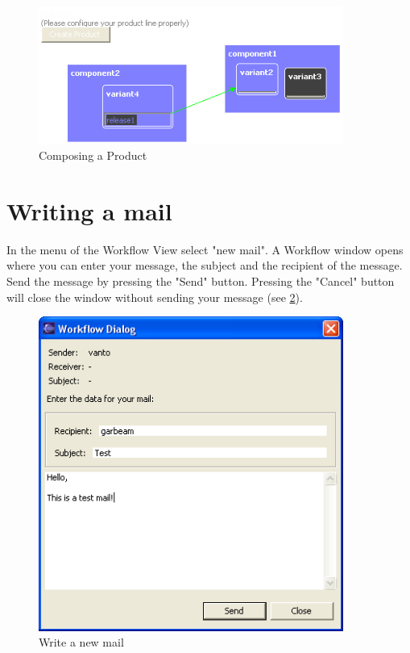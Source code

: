 \begin{figure}[h!]
\begin{center}
\includegraphics[width=10cm]{composeproduct.png}
   \caption{Composing a Product}
\label{compose}
\end{center}
\end{figure}\par





\section{Writing a mail}

In the menu of the Workflow View select "new mail". A Workflow window opens where
you can enter your message, the subject and the recipient of the message. Send the
message by pressing the "Send" button. Pressing the "Cancel" button will close the window
without sending your message (see \ref{writemail}).

\begin{figure}[h!]
\begin{center}
\includegraphics[width=10cm]{writemail.png}
   \caption{Write a new mail}
\label{writemail}
\end{center}
\end{figure}\par

